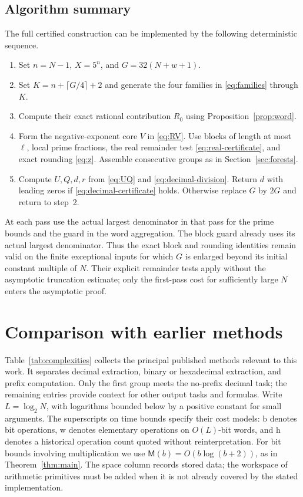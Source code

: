 \documentclass[11pt]{article}
\numberwithin{equation}{section}
\theoremstyle{definition}
\newcommand{\M}{\mathsf M}
\begin{document}
\begin{samepage}
\subsection{Algorithm summary}

The full certified construction can be implemented by the
following deterministic sequence.
\begin{enumerate}
 \item Set $n=N-1$, $X=5^n$, and $G=32(N+w+1)$.
 \item Set $K=n+\lceil G/4\rceil+2$ and generate the four
 families in \eqref{eq:families} through $K$.
 \item Compute their exact rational contribution $R_0$
 using Proposition~\ref{prop:word}.
 \item Form the negative-exponent core $V$ in \eqref{eq:RV}.
 Use blocks of length at most $\ell$, local prime fractions,
 the real remainder test \eqref{eq:real-certificate}, and
 exact rounding \eqref{eq:z}. Assemble consecutive groups
 as in Section~\ref{sec:forests}.
 \item Compute $U,Q,d,r$ from \eqref{eq:UQ} and
 \eqref{eq:decimal-division}. Return $d$ with leading zeros
 if \eqref{eq:decimal-certificate} holds. Otherwise replace
 $G$ by $2G$ and return to step~2.
\end{enumerate}
\end{samepage}
At each pass use the actual largest denominator in that pass
for the prime bounds and the guard in the word aggregation.
The block guard already uses its actual largest denominator.
Thus the exact block and rounding identities remain valid on
the finite exceptional inputs for which $G$ is enlarged beyond
its initial constant multiple of $N$. Their explicit remainder
tests apply without the asymptotic truncation estimate; only
the first-pass cost for sufficiently large $N$ enters the
asymptotic proof.

\section{Comparison with earlier methods}\label{sec:complexity-comparison}

Table~\ref{tab:complexities} collects the principal published
methods relevant to this work. It separates decimal extraction,
binary or hexadecimal extraction, and prefix computation.
Only the first group meets the no-prefix decimal task; the
remaining entries provide context for other output tasks and formulas.
Write $L=\log_2 N$, with logarithms bounded below by a positive
constant for small arguments. The superscripts on time bounds
specify their cost models: $\mathrm b$ denotes bit operations,
$\mathrm w$ denotes elementary operations on $O(L)$-bit words,
and $\mathrm h$ denotes a historical operation count quoted
without reinterpretation. For bit bounds involving multiplication
we use $\M(b)=O(b\log(b+2))$, as in Theorem~\ref{thm:main}.
The space column records stored data; the workspace of arithmetic
primitives must be added when it is not already covered by the
stated implementation.
\end{document}
